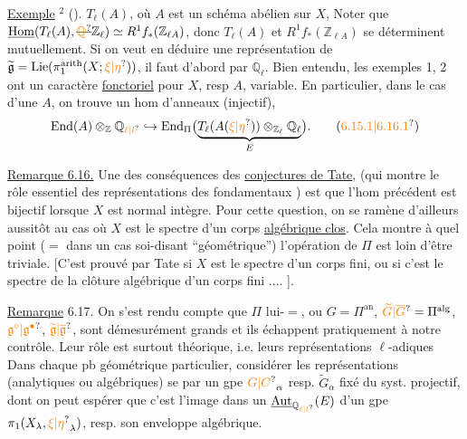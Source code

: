 \uline{Exemple} $^2$ (). $T_\ell(A)$, où $A$ est un schéma abélien sur $X$,  Noter que $\underline{\operatorname{Hom}}(T_\ell(A),\deleted{\unsure{\mathbb{Q}}}\mathbb{Z}_\ell)\simeq R^1 f_*(\mathbb{Z}_{\ell A})$, donc $T_\ell(A)$ et $R^1 f_*(\mathbb{Z}_{\ell A})$ se déterminent mutuellement.  Si on veut en déduire une représentation de $\widetilde{\mathfrak g}=\operatorname{Lie}(\pi_1^{\mathrm{arith}}(X;\unsure{\xi|\eta}))$, il faut  d'abord par $\mathbb{Q}_\ell$.
Bien entendu, les exemples 1, 2  ont un caractère \uline{fonctoriel} pour $X$, resp $A$, variable. En particulier, dans le cas d'une $A$, on trouve un hom d'anneaux (injectif),
\[
\operatorname{End}(A)\otimes_{\mathbb{Z}}\mathbb{Q}_{\unsure{\ell|l}}\hookrightarrow\operatorname{End}_{\Pi}\bigl(\underbrace{T_\ell(A(\unsure{\xi|\eta}))\otimes_{\mathbb{Z}_\ell}\mathbb{Q}_\ell}_{E}\bigr).
\tag*{(\unsure{6.15.1|6.16.1})}
\]

\uline{Remarque 6.16.} Une des conséquences des \uline{conjectures de Tate}, (qui montre le rôle essentiel des représentations  des  fondamentaux  ) est que l'hom précédent est bijectif  lorsque $X$ est normal intègre. Pour cette question, on se ramène d'ailleurs aussitôt au cas où $X$ est le spectre d'un corps \uline{algébrique clos}. Cela montre à quel point ($=$ dans un cas soi-disant ``géométrique'') l'opération de $\Pi$ est loin d'être triviale. [C'est prouvé par Tate si $X$ est le spectre d'un corps fini,  ou   si c'est le spectre de la clôture algébrique d'un corps fini .... ].

\uline{Remarque} 6.17. On s'est rendu compte que $\Pi$ lui-$=$, ou $G=\Pi^{\mathrm{an}}$, $\unsure{\widetilde G|\overline G}=\Pi^{\mathrm{alg}}$, $\unsure{\mathfrak g^\circ|\mathfrak g^\bullet}$, $\unsure{\widetilde{\mathfrak g}|\overline{\mathfrak g}}$, sont démesurément grands et ils échappent pratiquement à notre contrôle. Leur rôle est surtout théorique, i.e. leurs représentations $\ell$-adiques
Dans chaque pb géométrique particulier,  considérer les représentations (analytiques ou algébriques) se  par un gpe  $\unsure{G|C}_\alpha$ resp. $\widetilde G_\alpha$ fixé du syst. projectif, dont on peut espérer que c'est l'image dans un $\underline{\operatorname{Aut}}_{\mathbb{Q}_{\unsure{\ell|l}}}(E)$ d'un gpe $\pi_1(X_\lambda,\unsure{\xi|\eta}_\lambda)$, resp. son enveloppe algébrique.

